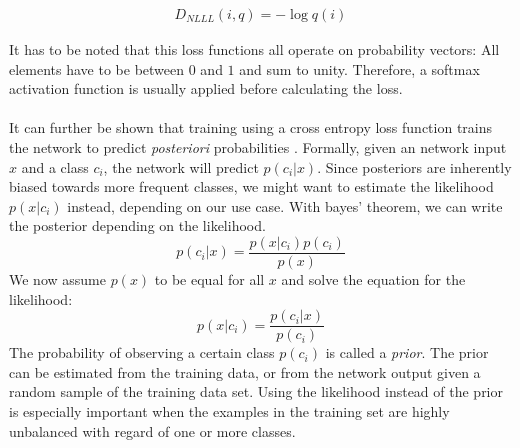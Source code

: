 \begin{align}
D_{NLLL}(i, q) = -\log q(i)
\label{eq:nlll}
\end{align}

It has to be noted that this loss functions all operate on probability vectors: All elements have to be between $0$ and $1$ and sum to unity. Therefore, a softmax activation function is usually applied before calculating the loss. \\ \\
It can further be shown that training using a cross entropy loss function trains the network to predict \textit{posteriori} probabilities \cite{richard1991neural}. Formally, given an network input $x$ and a class $c_i$, the network will predict $p(c_i|x)$. Since posteriors are inherently biased towards more frequent classes, we might want to estimate the likelihood $p(x|c_i)$ instead, depending on our use case. With bayes' theorem, we can write the posterior depending on the likelihood. 
\[
p(c_i|x) = \frac{p(x|c_i) p(c_i)}{p(x)}
\]
We now assume $p(x)$ to be equal for all $x$ and solve the equation for the likelihood:
\[
p(x|c_i) = \frac{p(c_i|x)}{p(c_i)}
\]
The probability of observing a certain class $p(c_i)$ is called a \textit{prior}. The prior can be estimated from the training data, or from the network output given a random sample of the training data set. Using the likelihood instead of the prior is especially important when the examples in the training set are highly unbalanced with regard of one or more classes. 
